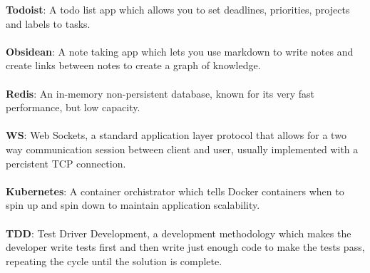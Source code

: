 \documentclass[titlepage]{article}
\begin{document}
\textbf{Todoist}: A todo list app which allows you to set deadlines, priorities, projects and labels to tasks. \\
\\
\textbf{Obsidean}: A note taking app which lets you use markdown to write notes and create links between notes to create a graph of knowledge. \\
\\
\textbf{Redis}: An in-memory non-persistent database, known for its very fast performance, but low capacity. \\
\\
\textbf{WS}: Web Sockets, a standard application layer protocol that allows for a two way communication session between client and user, usually implemented with a percistent TCP connection. \\
\\
\textbf{Kubernetes}: A container orchistrator which tells Docker containers when to spin up and spin down to maintain application scalability. \\
\\
\textbf{TDD}: Test Driver Development, a development methodology which makes the developer write tests first and then write just enough code to make the tests pass, repeating the cycle until the solution is complete. \\
\\

\pagebreak



\end{document}
